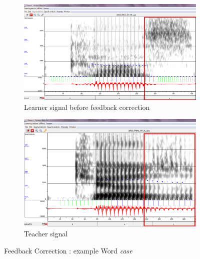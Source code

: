 \documentclass[11pt]{beamer}
\begin{document}
\begin{frame}

\begin{figure}
\begin{subfigure}{.5\textwidth}
  \centering
  \includegraphics[width=0.9\linewidth]{images/case_learner-changed.PNG}
  \caption{Learner signal before feedback correction}
  \label{fig:sfig1}
\end{subfigure}%
\begin{subfigure}{.5\textwidth}
  \centering
  \includegraphics[width=0.9\linewidth]{images/teacher_case_Changed.PNG}
  \caption{Teacher signal}
  \label{fig:sfig2}
\end{subfigure}
\caption{Feedback Correction : example Word \emph{case}}
\label{fig:fig}
\end{figure}
\end{frame}
\end{document}
